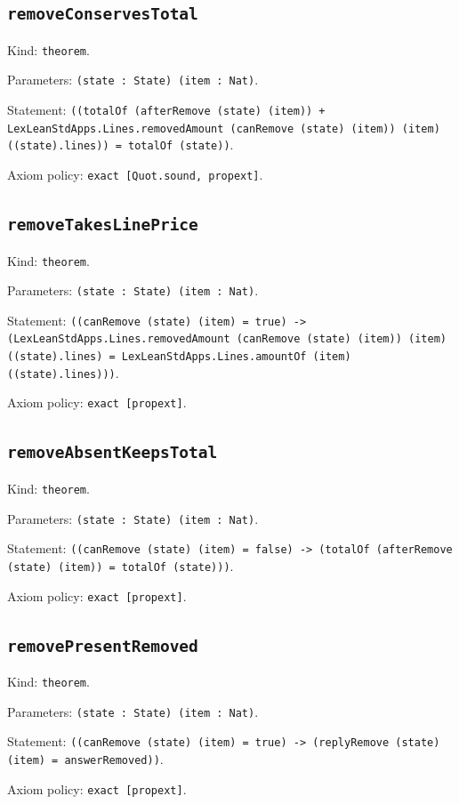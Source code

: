 \documentclass[11pt]{article}
\begin{document}
\subsection*{\texttt{removeConservesTotal}}
\noindent Kind: \texttt{theorem}.\par
\noindent Parameters: \texttt{(state : State) (item : Nat)}.\par
\noindent Statement: \texttt{((totalOf (afterRemove (state) (item)) + LexLeanStdApps.Lines.removedAmount (canRemove (state) (item)) (item) ((state).lines)) = totalOf (state))}.\par
\noindent Axiom policy: \texttt{exact [Quot.sound, propext]}.\par
\subsection*{\texttt{removeTakesLinePrice}}
\noindent Kind: \texttt{theorem}.\par
\noindent Parameters: \texttt{(state : State) (item : Nat)}.\par
\noindent Statement: \texttt{((canRemove (state) (item) = true) -> (LexLeanStdApps.Lines.removedAmount (canRemove (state) (item)) (item) ((state).lines) = LexLeanStdApps.Lines.amountOf (item) ((state).lines)))}.\par
\noindent Axiom policy: \texttt{exact [propext]}.\par
\subsection*{\texttt{removeAbsentKeepsTotal}}
\noindent Kind: \texttt{theorem}.\par
\noindent Parameters: \texttt{(state : State) (item : Nat)}.\par
\noindent Statement: \texttt{((canRemove (state) (item) = false) -> (totalOf (afterRemove (state) (item)) = totalOf (state)))}.\par
\noindent Axiom policy: \texttt{exact [propext]}.\par
\subsection*{\texttt{removePresentRemoved}}
\noindent Kind: \texttt{theorem}.\par
\noindent Parameters: \texttt{(state : State) (item : Nat)}.\par
\noindent Statement: \texttt{((canRemove (state) (item) = true) -> (replyRemove (state) (item) = answerRemoved))}.\par
\noindent Axiom policy: \texttt{exact [propext]}.\par
\end{document}
